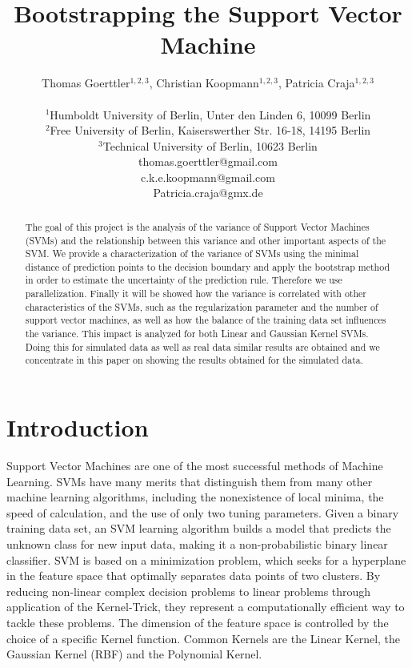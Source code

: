 \documentclass[a4paper]{article}
\title{Bootstrapping the Support Vector Machine}
\author{Thomas Goerttler$^{1,2,3}$, Christian Koopmann$^{1,2,3}$, Patricia Craja$^{1,2,3}$ \\
\mbox{}\\
$^1$Humboldt University of Berlin, Unter den Linden 6, 10099 Berlin \\
$^2$Free University of Berlin, Kaiserswerther Str. 16-18, 14195 Berlin \\
$^3$Technical University of Berlin, 10623 Berlin \\
thomas.goerttler@gmail.com\\
c.k.e.koopmann@gmail.com\\
Patricia.craja@gmx.de\\
}
\begin{document}
\maketitle


\begin{abstract}
The goal of this project is the analysis of the variance of Support Vector Machines (SVMs) and the relationship between this variance and other important aspects of the SVM. We provide a characterization of the variance of SVMs using the minimal distance of prediction points to the decision boundary and apply the bootstrap method in order to estimate the uncertainty of the prediction rule. Therefore we use parallelization. Finally it will be showed how the variance is correlated with other characteristics of the SVMs, such as the regularization parameter and the number of support vector machines, as well as how the balance of the training data set influences the variance. This impact is analyzed for both Linear and Gaussian Kernel SVMs. Doing this for simulated data as well as real data similar results are obtained and we concentrate in this paper on showing the results obtained for the simulated data. 
  
\end{abstract}

\section{Introduction}

Support Vector Machines are one of the most successful methods of Machine Learning\cite{steinwart_support_2008}. SVMs have many merits that distinguish them from many other machine learning algorithms, including the nonexistence of local minima, the speed of calculation, and the use of only two tuning parameters. Given a binary training data set, an SVM learning algorithm builds a model that predicts the unknown class for new input data, making it a non-probabilistic binary linear classifier.\cite{cristianini_introduction_2000} SVM is based on a minimization problem, which seeks for a hyperplane in the feature space that optimally separates data points of two clusters.  By reducing non-linear complex decision problems to linear problems through application of the Kernel-Trick, they represent a computationally efficient way to tackle these problems. The dimension of the feature space is controlled by the choice of a specific Kernel function. Common Kernels are the Linear Kernel, the Gaussian Kernel (RBF) and the Polynomial Kernel.
\end{document}
